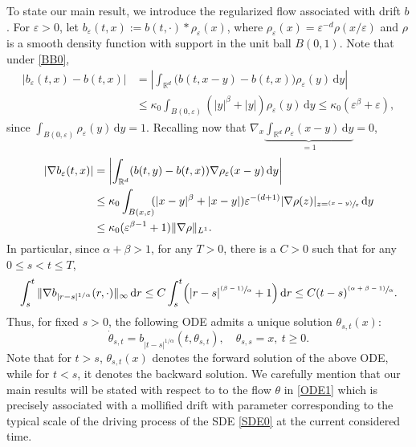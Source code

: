 \documentclass[11pt]{article}
\numberwithin{equation}{section}\providecommand{\asymp}{\mathrel{\sim}}
\newcommand{\psfrac}[2]{\sfrac{(#1)}{#2}}
\newcommand{\rd}{\mathrm{d}}
\theoremstyle{plain}
\theoremstyle{definition}
\let\eps\varepsilon
\newcommand\mR{\mathbb{R}}
\newcommand\1{{\mathbf{1}}}
\newcommand{\dif}{\,\mathrm{d}}
\begin{document}
To state our main result, we introduce the regularized flow associated with drift $b$.
For $\eps>0$, let $b_\eps(t,x):=b(t,\cdot)*\rho_\eps(x)$, where $\rho_\eps(x)=\eps^{-d}\rho(x/\eps)$
and $\rho$ is a smooth density function with support in the unit ball $B(0,1)$.
Note that under \eqref{BB0},
\begin{equation}
\begin{aligned}\label{LL19}
|b_\eps(t,x)-b(t,x)|&=
\left|\int_{\mR^d} \bigl(b(t,x-y)-b(t,x)\bigr)\rho_\eps(y)\dif y\right|\\
&\le 
\kappa_0 \int_{B(0,\eps)}( |y|^\beta+|y|) \rho_\eps(y)\dif y\leq \kappa_0(\eps^\beta+\eps),
\end{aligned}
\end{equation}
{since $\int_{B(0,\eps)}\rho_\eps(y)\dif y=1 $. Recalling now that $\nabla_x\underbrace{\int_{\mR^d} \rho_\eps(x-y) \dif y}_{=1}=0 $},
\begin{equation}
\begin{aligned}\label{LL1}
|\nabla b_\eps(t,x)|
&=\left|\int_{\mR^d}(b(t,y)-b(t,x))\nabla\rho_\eps(x-y)\dif y\right|\\
&\leq \kappa_0\int_{B(x,\eps)} \!\!(|x-y|^\beta+|x-y|) \eps^{-(d+1)}|\nabla \rho(z)|_{z=\psfrac{x-y}\eps}\,\rd y
\\
&\le  \kappa_0(\eps^{\beta-1}+1)\|\nabla\rho\|_{L^1}.
\end{aligned}
\end{equation}
In particular, since $\alpha+\beta>1$, for any $T>0$, there is a $C>0$ such that for any $0\leq s<t\leq T$,
\begin{equation}\label{LL01}
\int^t_s\|\nabla b_{|r-s|^{1/\alpha}}(r,\cdot)\|_\infty\dif r
\leq C
\int^t_s\Bigl(|r-s|^{\psfrac{\beta-1}{\alpha}}+1\Bigr)\dif r
\leq C(t-s)^{\psfrac{\alpha+\beta-1}{\alpha}}.
\end{equation}
Thus, for fixed $s>0$, the following ODE admits a unique solution $\theta_{s,t}(x)$:
\begin{equation}\label{ODE1}
\dot\theta_{s,t}=b_{|t-s|^{1/\alpha}}(t,\theta_{s,t}),\quad \theta_{s,s}=x,\ t\geq 0.
\end{equation}
Note that for $t>s$, $\theta_{s,t}(x)$ denotes the forward solution of the above ODE, while for $t<s$,
it denotes the backward solution. We carefully mention that our main results will be stated with respect to to the flow $\theta $ in \eqref{ODE1} which is precisely associated with a mollified drift with parameter corresponding to the typical scale of the driving process of the SDE \eqref{SDE0} at the current considered time.
\end{document}
